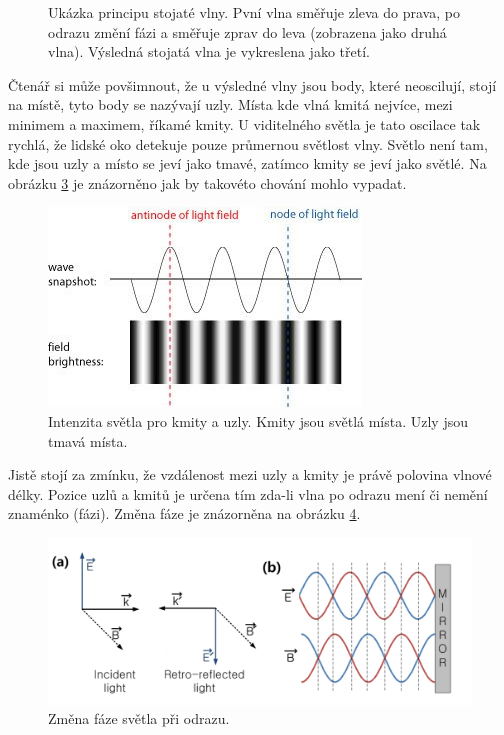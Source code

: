 \documentclass[12pt,a4paper,titlepage,final]{report}
\begin{document}
\begin{figure}[!h]
\begin{subfigure}[b]{0.23\textwidth}
                \caption{}
                \label{fig:standing_wave:frame_4}
        \end{subfigure}
        \caption{Ukázka principu stojaté vlny. Pvní vlna směřuje zleva do prava, po odrazu změní fázi a směřuje zprav do leva (zobrazena jako druhá vlna). Výsledná stojatá vlna je vykreslena jako třetí.}\label{fig:standing_wave}
\end{figure}

Čtenář si může povšimnout, že u výsledné vlny jsou body, které neoscilují, stojí na místě, tyto body se nazývají uzly. Místa
kde vlná kmitá nejvíce, mezi minimem a maximem, říkamé kmity.
U viditelného světla je tato oscilace tak rychlá, že lidské oko
detekuje pouze průmernou světlost vlny. Světlo není tam, kde jsou uzly a místo se jeví jako tmavé, zatímco kmity se jeví jako světlé.
Na obrázku \ref{fig:intensityvsamplitude} je znázorněno jak by takovéto chování mohlo vypadat.

\begin{figure}[!htb]
   \centering
 	\includegraphics{intensityvsamplitude}
   \caption{Intenzita světla pro kmity a uzly. Kmity jsou světlá místa. Uzly jsou tmavá místa.}
   \label{fig:intensityvsamplitude}
\end{figure}

Jistě stojí za zmínku, že vzdálenost mezi uzly a kmity je 
právě polovina vlnové délky. Pozice uzlů a kmitů je určena tím
zda-li vlna po odrazu mení či nemění znaménko (fázi). Změna fáze je 
znázorněna na obrázku \ref{fig:eh_reflection}.

\begin{figure}[!htb]
   \centering
 	\includegraphics[width=\textwidth]{eh_reflection}
   \caption{Změna fáze světla při odrazu.}
   \label{fig:eh_reflection}
\end{figure}
\end{document}
